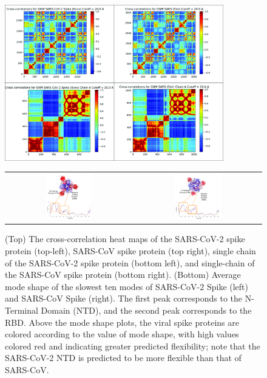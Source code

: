 \begin{figure}[p]
	\centering
	\mySfFamily
	\includegraphics[width = 0.85\textwidth]{../images_CMYK/CrossCorr}\\[2ex]
	\begin{tabular}{c c}
	\includegraphics[width = 0.38\textwidth]{../images_CMYK/spike_slowmode_SARS-CoV-2} & \includegraphics[width = 0.38\textwidth]{../images_CMYK/spike_slowmode_SARS-CoV}
	\end{tabular}
	\caption{(Top) The cross-correlation heat maps of the SARS-CoV-2 spike protein (top-left), SARS-CoV spike protein (top right), single chain of the SARS-CoV-2 spike protein (bottom left), and single-chain of the SARS-CoV spike protein (bottom right). (Bottom) Average mode shape of the slowest ten modes of SARS-CoV-2 Spike (left) and SARS-CoV Spike (right). The first peak corresponds to the N-Terminal Domain (NTD), and the second peak corresponds to the RBD. Above the mode shape plots, the viral spike proteins are colored according to the value of mode shape, with high values colored red and indicating greater predicted flexibility; note that the SARS-CoV-2 NTD is predicted to be more flexible than that of SARS-CoV.}
	\label{fig:spike_crosscorr_slowmode}
\end{figure}

